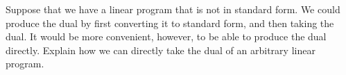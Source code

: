 \documentclass[11pt, a4paper, UTF8]{ctexart}
\begin{document}
\begin{problem}[TC 29.4-2]
Suppose that we have a linear program that is not in standard form. We could produce the dual by first converting it to standard form, and then taking the dual. It would be more convenient, however, to be able to produce the dual directly. Explain how we can directly take the dual of an arbitrary linear program.
\end{problem}
\begin{solution}
    
\end{solution}


%







%





\end{document}
